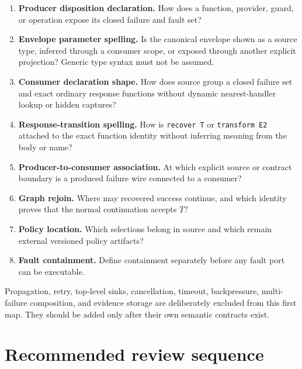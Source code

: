 \documentclass[11pt,a4paper]{article}
\newcommand{\code}[1]{\texttt{#1}}
\begin{document}
\begin{enumerate}[leftmargin=*]
  \item \textbf{Producer disposition declaration.} How does a function,
        provider, guard, or operation expose its closed failure and fault set?
  \item \textbf{Envelope parameter spelling.} Is the canonical envelope shown
        as a source type, inferred through a consumer scope, or exposed through
        another explicit projection? Generic type syntax must not be assumed.
  \item \textbf{Consumer declaration shape.} How does source group a closed
        failure set and exact ordinary response functions without dynamic
        nearest-handler lookup or hidden captures?
  \item \textbf{Response-transition spelling.} How is \code{recover T} or
        \code{transform E2} attached to the exact function identity without
        inferring meaning from the body or name?
  \item \textbf{Producer-to-consumer association.} At which explicit source or
        contract boundary is a produced failure wire connected to a consumer?
  \item \textbf{Graph rejoin.} Where may recovered success continue, and which
        identity proves that the normal continuation accepts $T$?
  \item \textbf{Policy location.} Which selections belong in source and which
        remain external versioned policy artifacts?
  \item \textbf{Fault containment.} Define containment separately before any
        fault port can be executable.
\end{enumerate}

Propagation, retry, top-level sinks, cancellation, timeout, backpressure,
multi-failure composition, and evidence storage are deliberately excluded from
this first map. They should be added only after their own semantic contracts
exist.

\section{Recommended review sequence}
\end{document}
